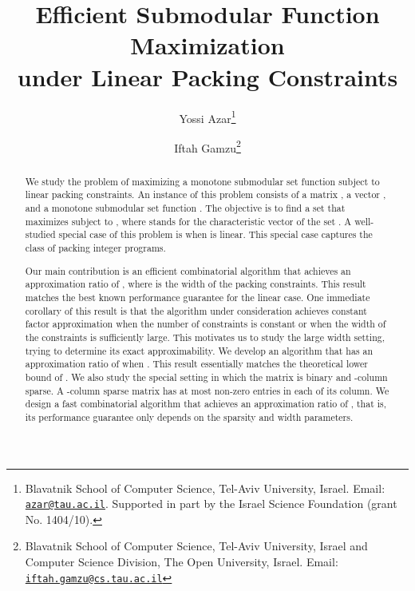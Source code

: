 \documentclass[11pt]{article}
\theoremstyle{plain}
\theoremstyle{definition}
\begin{document}
\begin{titlepage}
\title{Efficient Submodular Function Maximization\\under Linear Packing Constraints}
\author{
    Yossi Azar\thanks{Blavatnik School of Computer Science, Tel-Aviv
    University, Israel. Email: \href{mailto:azar@tau.ac.il}
    {\tt azar@tau.ac.il}. Supported in part by the Israel Science
    Foundation (grant No. 1404/10).}
    \and
    Iftah Gamzu\thanks{Blavatnik School of Computer Science, Tel-Aviv
    University, Israel and Computer Science Division, The Open University, Israel.
    Email: \href{mailto:iftah.gamzu@cs.tau.ac.il}{\tt iftah.gamzu@cs.tau.ac.il}}
}
\date{}
\maketitle

\begin{abstract}
We study the problem of maximizing a monotone submodular set
function subject to linear packing constraints. An instance of
this problem consists of a matrix , a
vector , and a monotone submodular set
function . The objective is to find
a set  that maximizes  subject to , where
 stands for the characteristic vector of the set . A
well-studied special case of this problem is when  is linear.
This special case captures the class of packing integer programs.

Our main contribution is an efficient combinatorial algorithm that
achieves an approximation ratio of , where  is the width of the packing
constraints. This result matches the best known performance
guarantee for the linear case. One immediate corollary of this
result is that the algorithm under consideration achieves constant
factor approximation when the number of constraints is constant or
when the width of the constraints is sufficiently large. This
motivates us to study the large width setting, trying to determine
its exact approximability. We develop an algorithm that has an
approximation ratio of  when . This result essentially matches the
theoretical lower bound of . We also study the special
setting in which the matrix  is binary and -column sparse. A
-column sparse matrix has at most  non-zero entries in each
of its column. We design a fast combinatorial algorithm that
achieves an approximation ratio of , that
is, its performance guarantee only depends on the sparsity and
width parameters.
\end{abstract}

\thispagestyle{empty}
\end{titlepage}
\end{document}
